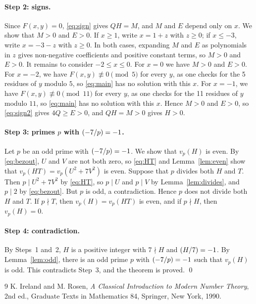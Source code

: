 \documentclass[11pt]{article}
\newcommand{\leg}[2]{\mathchoice{\biggl(\dfrac{#1}{#2}\biggr)}{(#1/#2)}{(#1/#2)}{(#1/#2)}}
\begin{document}
\paragraph{Step 2: signs.} Since $F(x,y)=0$, \eqref{eq:sign} gives $QH=M$, and $M$ and $E$ depend only on $x$. We show that $M>0$ and $E>0$. If $x\geq1$, write $x=1+z$ with $z\geq0$; if $x\leq-3$, write $x=-3-z$ with $z\geq0$. In both cases, expanding $M$ and $E$ as polynomials in $z$ gives non-negative coefficients and positive constant terms, so $M>0$ and $E>0$. It remains to consider $-2\leq x\leq0$. For $x=0$ we have $M>0$ and $E>0$. For $x=-2$, we have $F(x,y)\not\equiv0\pmod{5}$ for every $y$, as one checks for the 5 residues of $y$ modulo $5$, so \eqref{eq:main} has no solution with this $x$. For $x=-1$, we have $F(x,y)\not\equiv0\pmod{11}$ for every $y$, as one checks for the 11 residues of $y$ modulo $11$, so \eqref{eq:main} has no solution with this $x$. Hence $M>0$ and $E>0$, so \eqref{eq:sign2} gives $4Q\geq E>0$, and $QH=M>0$ gives $H>0$.

\paragraph{\texorpdfstring{Step 3: primes $p$ with $\leg{-7}{p}=-1$.}{Step 3: inert primes.}} Let $p$ be an odd prime with $\leg{-7}{p}=-1$. We show that $v_p(H)$ is even. By \eqref{eq:bezout}, $U$ and $V$ are not both zero, so \eqref{eq:HT} and Lemma~\ref{lem:even} show that $v_p(HT)=v_p(U^2+7V^2)$ is even. Suppose that $p$ divides both $H$ and $T$. Then $p\mid U^2+7V^2$ by \eqref{eq:HT}, so $p\mid U$ and $p\mid V$ by Lemma~\ref{lem:divides}, and $p\mid 2$ by \eqref{eq:bezout}. But $p$ is odd, a contradiction. Hence $p$ does not divide both $H$ and $T$. If $p\nmid T$, then $v_p(H)=v_p(HT)$ is even, and if $p\nmid H$, then $v_p(H)=0$.

\paragraph{Step 4: contradiction.} By Steps~1 and~2, $H$ is a positive integer with $7\nmid H$ and $\leg{H}{7}=-1$. By Lemma~\ref{lem:odd}, there is an odd prime $p$ with $\leg{-7}{p}=-1$ such that $v_p(H)$ is odd. This contradicts Step~3, and the theorem is proved.
\qed

\begin{thebibliography}{9}
 K. Ireland and M. Rosen, \emph{A Classical Introduction to Modern Number Theory}, 2nd ed., Graduate Texts in Mathematics 84, Springer, New York, 1990.
\end{thebibliography}
\end{document}
